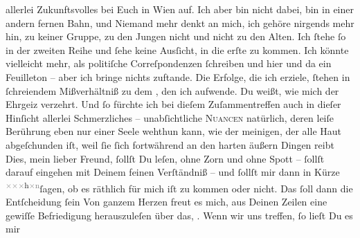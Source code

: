 \begin{ledgroupsized}[t]{13cm}
               allerlei Zukunftsvolles bei Euch in Wien auf. Ich
               aber bin nicht dabei, bin in einer andern fernen Bahn, und Niemand mehr denkt an
               mich, ich gehöre nirgends mehr hin, zu keiner Gruppe, zu den Jungen nicht und nicht
               zu den Alten. Ich ſtehe ſo {\pb}in der zweiten Reihe und
               ſehe keine Ausſicht, in die erſte zu kommen. Ich könnte vielleicht mehr, als
               politiſche Correſpondenzen ſchreiben und hier und da ein Feuilleton – aber ich bringe
               nichts zuftande. Die Erfolge, die ich erziele, ſtehen in ſchreiendem Mißverhältniß zu
               dem \label{K_L02608-4v}\label{K_L02608-4h}, den
               ich aufwende. Du weißt, wie mich der Ehrgeiz verzehrt.  Und ſo fürchte ich bei dieſem Zuſammentreffen auch in dieſer Hinſicht
               allerlei Schmerzliches – unabſichtliche \textsc{Nuancen} natürlich,
                   deren leiſe Berührung eben nur einer Seele
               wehthun  kann, wie der meinigen, der alle Haut
               abgeſchunden iſt, weil ſie ſich fortwährend an den harten {\pb}äußern Dingen reibt{\dotsfive}\pend
           \pstart
           Dies, mein lieber Freund, ſollſt Du leſen, ohne Zorn und ohne Spott – ſollſt darauf
               eingehen mit Deinem feinen Verſtändniß – und ſollſt mir dann in Kürze \substVorne{}\textsuperscript{\textcolor{gray}{×}\-\textcolor{gray}{×}\-\textcolor{gray}{×}h\textcolor{gray}{×}\textcolor{gray}{n}}\substDazwischen{}ſagen\substHinten{}, ob  es räthlich für mich iſt zu kommen
               oder nicht. Das ſoll dann die Entſcheidung ſein{\dotsfour}\pend
           \pstart
           Von ganzem Herzen freut es mich, aus Deinen Zeilen eine gewiſſe Befriedigung
                  herauszuleſen\strikeout{,} über das, \label{K_L02608-5v}\label{K_L02608-5h}. Wenn wir uns treffen, ſo lieſt Du es mir

\end{ledgroupsized}

